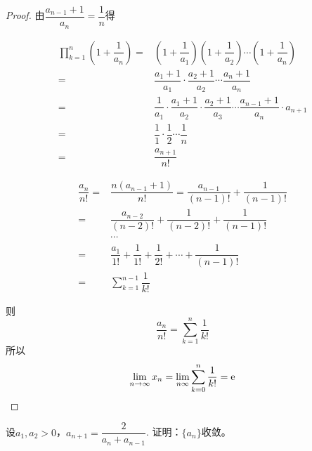 \begin{proof}

    由$\dfrac{a_{n - 1} + 1}{a_n} = \dfrac{1}{n}$得

    \begin{align*}
        \prod_{k  = 1}^{n}{\left( 1 + \dfrac{1}{a_n} \right)} = & \left( 1 + \dfrac{1}{a_1} \right) \left( 1 + \dfrac{1}{a_2} \right) \cdots \left( 1 + \dfrac{1}{a_n} \right) \\
        = & \dfrac{a_1 + 1}{a_1} \cdot \dfrac{a_2 + 1}{a_2} \cdots \dfrac{a_n + 1}{a_n} \\
        = & \dfrac{1}{a_1} \cdot \dfrac{a_1 + 1}{a_2} \cdot \dfrac{a_2 + 1}{a_3} \cdots \dfrac{a_{n - 1} + 1}{a_n} \cdot a_{n + 1} \\
        = & \dfrac{1}{1} \cdot \dfrac{1}{2} \cdots \dfrac{1}{n} \\
        = & \dfrac{a_{n + 1}}{n!} 
    \end{align*}

    \begin{align*}
        \dfrac{a_n}{n!} = & \dfrac{n(a_{n - 1} + 1)}{n!} = \dfrac{a_{n - 1}}{(n - 1)!} + \dfrac{1}{(n - 1)!} \\
        = & \dfrac{a_{n - 2}}{(n - 2)!} + \dfrac{1}{(n - 2)!} + \dfrac{1}{(n - 1)!} \\
        & \cdots \\ 
        = & \dfrac{a_1}{1!} + \dfrac{1}{1!} + \dfrac{1}{2!} + \cdots + \dfrac{1}{(n - 1)!} \\
        = & \sum\limits_{k  = 1}^{n - 1}{\dfrac{1}{k!}} 
    \end{align*}

    则
    $$\dfrac{a_n}{n!} = \sum\limits_{k  = 1}^{n}{\dfrac{1}{k!}}$$
    所以
    $$\lim\limits_{n \to \infty}{x_n} = \lim\limits_{n\infty}{\sum\limits_{k = 0}^{n}{\dfrac{1}{k!}}} = \mathrm{e}$$

\end{proof}

\begin{proposition}

    设$a_1, a_2 > 0$，$a_{n + 1} = \dfrac{2}{a_n + a_{n - 1}}$. 证明：$\{a_n\}$收敛。

\end{proposition}

